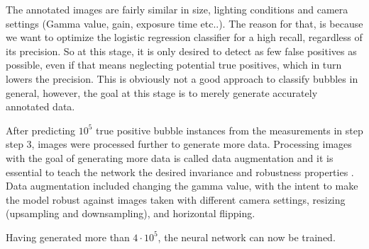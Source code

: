 			The annotated images are fairly similar in size, lighting conditions and camera settings (Gamma value, gain, exposure time etc..). The reason for that, is because we want to optimize the logistic regression classifier for a high recall, regardless of its precision. So at this stage, it is only desired to detect as few false positives as possible, even if that means neglecting potential true positives, which in turn lowers the precision. This is obviously not a good approach to classify bubbles in general, however, the goal at this stage is to merely generate accurately annotated data. 
			
			After predicting $10^5$ true positive bubble instances from the measurements in step step 3, images were processed further to generate more data. Processing images with the goal of generating more data is called data augmentation and it is essential to teach the network the desired invariance and robustness properties \citep{UNet}. Data augmentation included changing the gamma value, with the intent to make the model robust against images taken with different camera settings, resizing (upsampling and downsampling), and horizontal flipping.
			
			Having generated more than $4 \cdot 10^5$, the neural network can now be trained. 
			
			
			
			

%
%			
%			
%			
%			
%	
%	
%	
	
